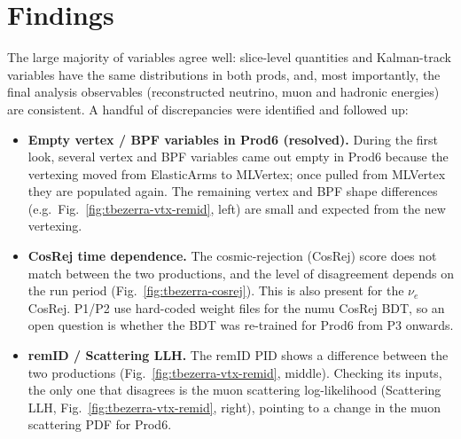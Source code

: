 \documentclass{article}
\begin{document}
\section{Findings}

The large majority of variables agree well: slice-level quantities and
Kalman-track variables have the same distributions in both prods, and, most
importantly, the final analysis observables (reconstructed neutrino, muon and
hadronic energies) are consistent. A handful of discrepancies were identified and
followed up:

\begin{itemize}
  \item \textbf{Empty vertex / BPF variables in Prod6 (resolved).} During the
  first look, several vertex and BPF variables came out
  empty in Prod6 because the vertexing moved from ElasticArms to MLVertex; once
  pulled from MLVertex they are populated again. The remaining vertex and BPF
  shape differences (e.g.\ Fig.~\ref{fig:tbezerra-vtx-remid}, left) are small and
  expected from the new vertexing.

  \item \textbf{CosRej time dependence.} The cosmic-rejection (CosRej) score does
  not match between the two productions, and the level of disagreement depends on
  the run period (Fig.~\ref{fig:tbezerra-cosrej}). This is also present for the
  $\nu_e$ CosRej. P1/P2 use hard-coded weight files for the numu CosRej BDT, so an
  open question is whether the BDT was re-trained for Prod6 from P3 onwards.

  \item \textbf{remID / Scattering LLH.} The remID PID shows a difference between
  the two productions (Fig.~\ref{fig:tbezerra-vtx-remid}, middle). Checking its
  inputs, the only one that disagrees is the muon scattering log-likelihood
  (Scattering LLH, Fig.~\ref{fig:tbezerra-vtx-remid}, right), pointing to a change
  in the muon scattering PDF for Prod6.
\end{itemize}
\end{document}
